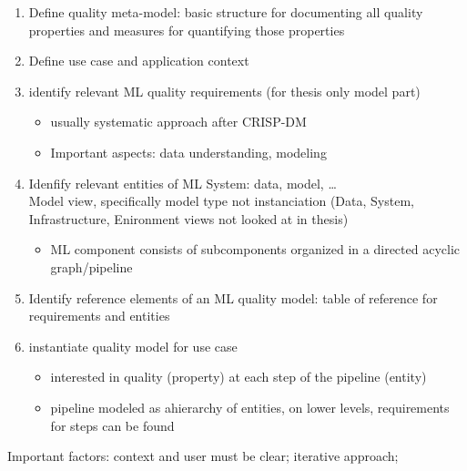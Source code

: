 \begin{enumerate}
    \item Define quality meta-model: basic structure for documenting all quality properties and
        measures for quantifying those properties
    \item Define use case and application context
    \item identify relevant ML quality requirements (for thesis only model part)
        \begin{itemize}
            \item usually systematic approach after CRISP-DM
            \item Important aspects: data understanding, modeling
        \end{itemize}
    \item Idenfify relevant entities of ML System: data, model, \ldots\\
        Model view, specifically model type not instanciation (Data, System, Infrastructure,
        Enironment views not looked at in thesis)
        \begin{itemize}
            \item ML component consists of subcomponents organized in a directed acyclic graph/pipeline
        \end{itemize}
    \item Identify reference elements of an ML quality model: table of reference for requirements
        and entities
    \item instantiate quality model for use case\\
        \begin{itemize}
            \item interested in quality (property) at each step of the pipeline (entity)
            \item pipeline modeled as ahierarchy of entities, on lower levels, requirements for steps
                can be found
        \end{itemize}
\end{enumerate}
Important factors: context and user must be clear; iterative approach;

